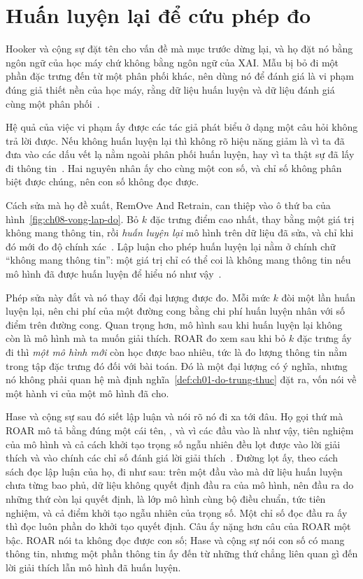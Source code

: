 \section{Huấn luyện lại để cứu phép đo}
\label{sec:ch08-huan-luyen-lai}

%
%
Hooker và cộng sự đặt tên cho vấn đề mà mục trước dừng lại, và họ đặt nó bằng
ngôn ngữ của học máy chứ không bằng ngôn ngữ của XAI. Mẫu bị bỏ đi một phần đặc
trưng đến từ một phân phối khác, nên dùng nó để đánh giá là vi phạm đúng giả
thiết nền của học máy, rằng dữ liệu huấn luyện và dữ liệu đánh giá cùng một
phân phối~\autocite{mroar}.

Hệ quả của việc vi phạm ấy được các tác giả phát biểu ở dạng một câu hỏi không
trả lời được. Nếu không huấn luyện lại thì không rõ hiệu năng giảm là vì ta đã
đưa vào các dấu vết lạ nằm ngoài phân phối huấn luyện, hay vì ta thật sự đã lấy
đi thông tin~\autocite{mroar}. Hai nguyên nhân ấy cho cùng một con số, và chỉ số
không phân biệt được chúng, nên con số không đọc được.

Cách sửa mà họ đề xuất, RemOve And Retrain, can thiệp vào ô thứ ba của
hình~\ref{fig:ch08-vong-lap-do}. Bỏ $k$ đặc trưng điểm cao nhất, thay bằng một
giá trị không mang thông tin, rồi \emph{huấn luyện lại} mô hình trên dữ liệu đã
sửa, và chỉ khi đó mới đo độ chính xác~\autocite{mroar}. Lập luận cho phép huấn
luyện lại nằm ở chính chữ \enquote{không mang thông tin}: một giá trị chỉ có thể
coi là không mang thông tin nếu mô hình đã được huấn luyện để hiểu nó như
vậy~\autocite{mroar}.

Phép sửa này đắt và nó thay đổi đại lượng được đo. Mỗi mức $k$ đòi một lần huấn
luyện lại, nên chi phí của một đường cong bằng chi phí huấn luyện nhân với số
điểm trên đường cong. Quan trọng hơn, mô hình sau khi huấn luyện lại không còn
là mô hình mà ta muốn giải thích. ROAR đo xem sau khi bỏ $k$ đặc trưng ấy đi thì
\emph{một mô hình mới} còn học được bao nhiêu, tức là đo lượng thông tin nằm
trong tập đặc trưng đó đối với bài toán. Đó là một đại lượng có ý nghĩa, nhưng
nó không phải quan hệ mà định nghĩa~\ref{def:ch01-do-trung-thuc} đặt ra, vốn nói
về một hành vi của một mô hình đã cho.

Hase và cộng sự sau đó siết lập luận và nói rõ nó đi xa tới đâu. Họ gọi thứ mà
ROAR mô tả bằng đúng một cái tên, ,
và vì các đầu vào  là như vậy, tiên nghiệm của
mô hình và cả cách khởi tạo trọng số ngẫu nhiên đều lọt được vào lời giải
thích và vào chính các chỉ số đánh giá lời giải thích~\autocite{mood}. Đường
lọt ấy, theo cách sách đọc lập luận của họ, đi như sau: trên một đầu vào mà dữ
liệu huấn luyện chưa từng bao phủ, dữ liệu không quyết định đầu ra của mô hình,
nên đầu ra do những thứ còn lại quyết định, là lớp mô hình cùng bộ điều chuẩn,
tức tiên nghiệm, và cả điểm khởi tạo ngẫu nhiên của trọng số. Một chỉ số đọc
đầu ra ấy thì đọc luôn phần do khởi tạo quyết định. Câu ấy nặng hơn câu của ROAR
một bậc. ROAR nói ta không đọc được con số; Hase và cộng sự nói con số có mang
thông tin, nhưng một phần thông tin ấy đến từ những thứ chẳng liên quan gì đến
lời giải thích lẫn mô hình đã huấn luyện.

